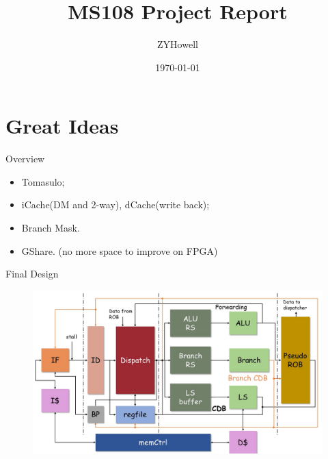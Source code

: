 \documentclass{beamer}
\title[Short title]{MS108 Project Report} %
\author{ZYHowell} %
\institute[The World Bank Group] %
{
Pitfall, Stories and Great Ideas(from others)\\ %
\medskip
}
\date{\today} %
\begin{document}
\begin{frame}
\titlepage %
\end{frame}


\section{Great Ideas}
\begin{frame}{Overview}
    \begin{itemize}
        \item Tomasulo;
        \item iCache(DM and 2-way), dCache(write back);
        \item Branch Mask. 
        \item GShare. (no more space to improve on FPGA)
    \end{itemize}
\end{frame}

\begin{frame}{Final Design}
 \begin{figure}[H]
  \centering
  \includegraphics[width=120mm]{design.jpg}
 \end{figure}
\end{frame}
\end{document}
